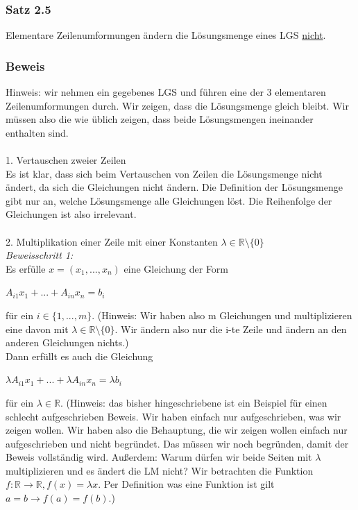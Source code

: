 \documentclass{article}
\begin{document}
\subsubsection*{Satz 2.5}
Elementare Zeilenumformungen ändern die Lösungsmenge eines LGS \underline{nicht}. \\

\subsubsection*{Beweis}
Hinweis: wir nehmen ein gegebenes LGS und führen eine der 3 elementaren Zeilenumformungen durch. Wir zeigen, dass die Lösungsmenge gleich bleibt. Wir müssen also die wie üblich zeigen, dass beide Lösungsmengen ineinander enthalten sind. \\
\\
1. Vertauschen zweier Zeilen \\
Es ist klar, dass sich beim Vertauschen von Zeilen die Lösungsmenge nicht ändert, da sich die Gleichungen nicht ändern. Die Definition der Lösungsmenge gibt nur an, welche Lösungsmenge alle Gleichungen löst. Die Reihenfolge der Gleichungen ist also irrelevant. \\
\\
2. Multiplikation einer Zeile mit einer Konstanten $\lambda \in \mathbb{R} \setminus \{0\}$ \\
\textit{Beweisschritt 1:} \\
Es erfülle $x = (x_1, ..., x_n)$ eine Gleichung der Form 
\begin{center}
    $A_{i1}x_1 + ... + A_{in}x_n = b_i$
\end{center}
für ein $i \in \{1, ..., m\}$. (Hinweis: Wir haben also m Gleichungen und multiplizieren eine davon mit $\lambda \in \mathbb{R} \setminus \{0\}$. Wir ändern also nur die i-te Zeile und ändern an den anderen Gleichungen nichts.) \\
Dann erfüllt es auch die Gleichung
\begin{center}
    $\lambda A_{i1}x_1 + ... + \lambda A_{in}x_n = \lambda b_i$
\end{center}
für ein $\lambda \in \mathbb{R}$.
(Hinweis: das bisher hingeschriebene ist ein Beispiel für einen schlecht aufgeschrieben Beweis. Wir haben einfach nur aufgeschrieben, was wir zeigen wollen. Wir haben also die Behauptung, die wir zeigen wollen einfach nur aufgeschrieben und nicht begründet. Das müssen wir noch begründen, damit der Beweis vollständig wird.
Außerdem: Warum dürfen wir beide Seiten mit $\lambda$ multiplizieren und es ändert die LM nicht? Wir betrachten die Funktion $f: \mathbb{R} \rightarrow \mathbb{R}, f(x)=\lambda x$. Per Definition was eine Funktion ist gilt $a=b \rightarrow f(a)=f(b)$.) \\
\end{document}
